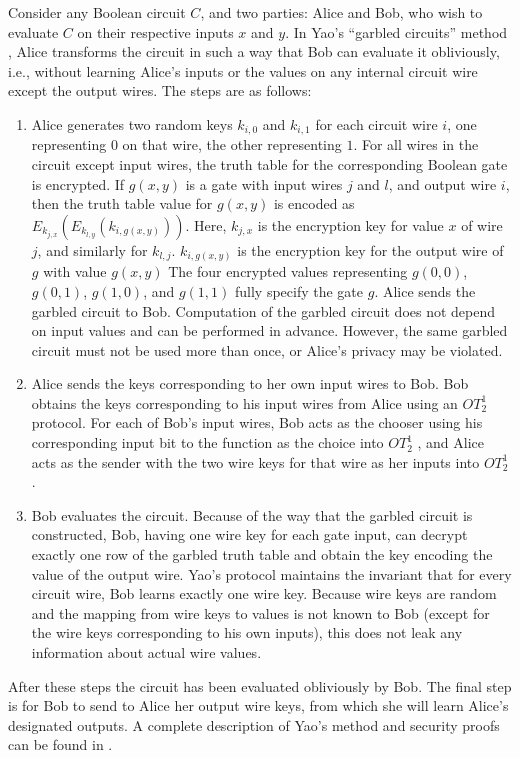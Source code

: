 Consider any Boolean circuit $C$, and two parties: Alice and Bob,
who wish to evaluate $C$ on their respective inputs $x$ and $y$.
In Yao's {}``garbled circuits'' method \cite{Yao86}, Alice transforms
the circuit in such a way that Bob can evaluate it obliviously, i.e.,
without learning Alice's inputs or the values on any internal circuit
wire except the output wires. The steps are as follows:
\begin{enumerate}
\item Alice generates two random keys $k_{i,0}$ and $k_{i,1}$ for each
circuit wire $i$, one representing $0$ on that wire, the other representing
$1$. For all wires in the circuit except input wires, the truth table
for the corresponding Boolean gate is encrypted. If $g(x,y)$ is a
gate with input wires $j$ and $l$, and output wire $i$, then the
truth table value for $g(x,y)$ is encoded as $E_{k_{j,x}}\left(E_{k_{l,y}}\left(k_{i,g(x,y)}\right)\right)$.
Here, $k_{j,x}$ is the encryption key for value $x$ of wire $j$,
and similarly for $k_{l,j}$. $k_{i,g(x,y)}$ is the encryption key
for the output wire of $g$ with value $g(x,y)$ The four encrypted
values representing $g(0,0)$, $g(0,1)$, $g(1,0)$, and $g(1,1)$
fully specify the gate $g$. Alice sends the garbled circuit to Bob.
Computation of the garbled circuit does not depend on input values
and can be performed in advance. However, the same garbled circuit
must not be used more than once, or Alice's privacy may be violated.
\item Alice sends the keys corresponding to her own input wires to Bob.
Bob obtains the keys corresponding to his input wires from Alice using
an $OT_{2}^{1}$ protocol. For each of Bob's input wires, Bob acts
as the chooser using his corresponding input bit to the function as the choice 
into $OT_{2}^{1}$ , and Alice acts as the sender with the two wire keys for that wire
as her inputs into $OT_{2}^{1}$ .
\item Bob evaluates the circuit. Because of the way that the garbled circuit
is constructed, Bob, having one wire key for each gate input, can
decrypt exactly one row of the garbled truth table and obtain the
key encoding the value of the output wire. Yao's protocol maintains
the invariant that for every circuit wire, Bob learns exactly one
wire key. Because wire keys are random and the mapping from wire keys
to values is not known to Bob (except for the wire keys corresponding
to his own inputs), this does not leak any information about actual
wire values. 
\end{enumerate}
After these steps the circuit has been evaluated obliviously by Bob.  The final step is for Bob to send
to Alice her output wire keys, from which she will learn Alice's designated outputs.
A complete description of Yao's method and security proofs can be found in \cite{Goldreich:vol2}.

